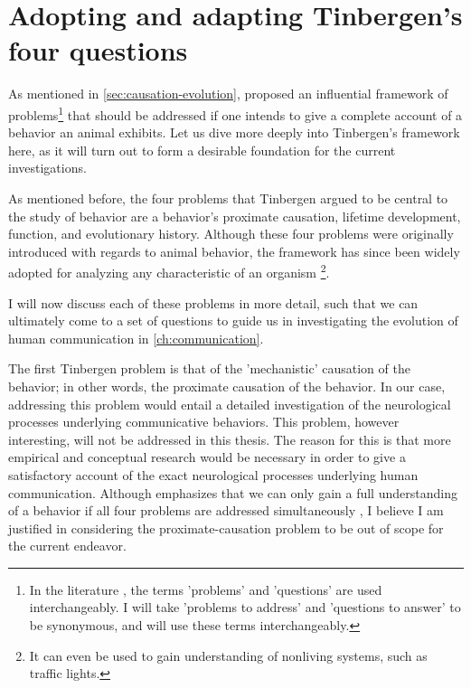\section{Adopting and adapting Tinbergen's four questions}
\label{sec:tinbergen}
As mentioned in \cref{sec:causation-evolution}, \citet{Tinbergen63} proposed an influential framework of problems\footnote{In the literature \citep[e.g.][]{BatesonLaland13}, the terms 'problems' and 'questions' are used interchangeably. I will take 'problems to address' and 'questions to answer' to be synonymous, and will use these terms interchangeably.} that should be addressed if one intends to give a complete account of a behavior an animal exhibits. Let us dive more deeply into Tinbergen's framework here, as it will turn out to form a desirable foundation for the current investigations.

As mentioned before, the four problems that Tinbergen argued to be central to the study of behavior are a behavior's proximate causation, lifetime development, function, and evolutionary history.
Although these four problems were originally introduced with regards to animal behavior, the framework has since been widely adopted for analyzing any characteristic of an organism \citep{BatesonLaland13}\footnote{It can even be used to gain understanding of nonliving systems, such as traffic lights.}.

I will now discuss each of these problems in more detail, such that we can ultimately come to a set of questions to guide us in investigating the evolution of human communication in \cref{ch:communication}.


The first Tinbergen problem is that of the 'mechanistic' causation of the behavior; in other words, the proximate causation of the behavior. In our case, addressing this problem would entail a detailed investigation of the neurological processes underlying communicative behaviors.
This problem, however interesting, will not be addressed in this thesis. The reason for this is that more empirical and conceptual research would be necessary in order to give a satisfactory account of the exact neurological processes underlying human communication. Although \citet{Tinbergen63} emphasizes that we can only gain a full understanding of a behavior if all four problems are addressed simultaneously \citep[see also][]{BatesonLaland13}, I believe I am justified in considering the proximate-causation problem to be out of scope for the current endeavor.


